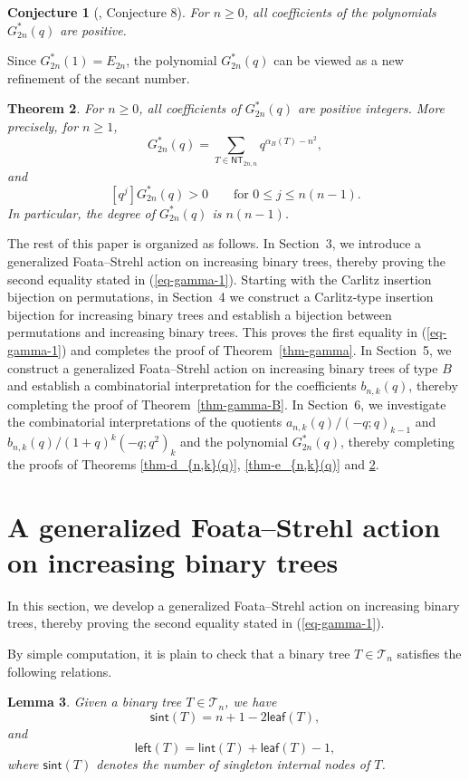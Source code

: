\documentclass[12pt]{article}
\numberwithin{equation}{section}
\theoremstyle{plain}
\newtheorem{theorem}{Theorem}[section]
\newtheorem{conjecture}[theorem]{Conjecture}
\newtheorem{lemma}[theorem]{Lemma}
\def\sint{\mathsf{sint}}
\def\l{\mathsf{left}}
\def\l{\mathsf{left}}
\def\lint{\mathsf{lint}}
\def\B{\mathcal{T}}
\def\leaf{\mathsf{leaf}}
\begin{document}
	 	  \begin{conjecture}[\cite{HanJouhetZeng2013qtriangles}, Conjecture 8]\label{con}
	 	  	For    $n\geq 0$, all coefficients of the polynomials $G^*_{2n}(q)$ are positive.
	 	  	\end{conjecture}
	 Since $G^*_{2n}(1) = E_{2n}$, the polynomial $G^*_{2n}(q)$ can be viewed as a new   refinement of the
	 secant number.
	 	 
	 	 
	 		\begin{theorem}\label{thm:positive-G-star}
	 	For  $n\geq 0$, all coefficients of $G_{2n}^{*}(q)$ are positive
	 	integers. More precisely, for $n\geq 1$,
	 	\[
	 	G_{2n}^{*}(q)
	 	=\sum_{T\in\mathsf{NT}_{2n,n}}q^{\alpha_B(T)-n^2},
	 	\]
	 	and
	 	\[
	 	[q^j]G_{2n}^{*}(q)>0
	 	\qquad\text{for }0\leq j\leq n(n-1).
	 	\]
	 	In particular, the degree of $G^*_{2n}(q)$ is $n(n-1)$.
	 	 
	 	\end{theorem}
	 	
	 	The rest of this paper is organized as follows. In Section~3, we introduce a generalized Foata--Strehl action on increasing binary trees,  thereby proving the second equality stated in (\ref{eq-gamma-1}). Starting with the Carlitz insertion bijection on permutations, in Section~4 we construct a Carlitz‑type insertion bijection for increasing binary trees and establish a bijection between permutations and increasing binary trees. This proves the first equality in (\ref{eq-gamma-1}) and completes the proof of Theorem~\ref{thm-gamma}. In Section~5, we construct a generalized Foata--Strehl action  on increasing binary trees  of type $B$ and establish a combinatorial interpretation for the coefficients $b_{n,k}(q)$, thereby completing the proof of Theorem~\ref{thm-gamma-B}.   In Section~6,   we investigate   the combinatorial interpretations  of  the quotients 
	 	$a_{n,k}(q)/ (-q;q)_{k-1}$  and $b_{n,k}(q)/(1+q)^k(-q; q^2)_k$ and the polynomial $G^*_{2n}(q)$, thereby completing the proofs of Theorems \ref{thm-d_{n,k}(q)}, \ref{thm-e_{n,k}(q)} and  \ref{thm:positive-G-star}. 
	 	
	 		\section{A generalized Foata–Strehl action on  increasing binary trees}
	 	In this section, we develop a generalized Foata–Strehl action 
	 	on increasing binary  trees, thereby proving the second equality   stated in (\ref{eq-gamma-1}).
	 	
	 	By  simple computation,   it is plain to check that a binary tree $T\in \B_n$ satisfies the following relations. 
	 	\begin{lemma}\label{lem-tree}
	 		Given a binary tree $T\in \B_n$, we have
	 		\begin{equation}\label{eq-sint}
	 			\sint(T)=n+1-2\leaf(T),
	 		\end{equation}
	 		and 
	 		\begin{equation}\label{eq-left}
	 			\l(T)= \lint(T)+ \leaf(T)-1,
	 		\end{equation}
	 		where  $\sint(T)$  denotes the number of singleton internal nodes    of $T$.
	 	\end{lemma}
	 	
\end{document}
